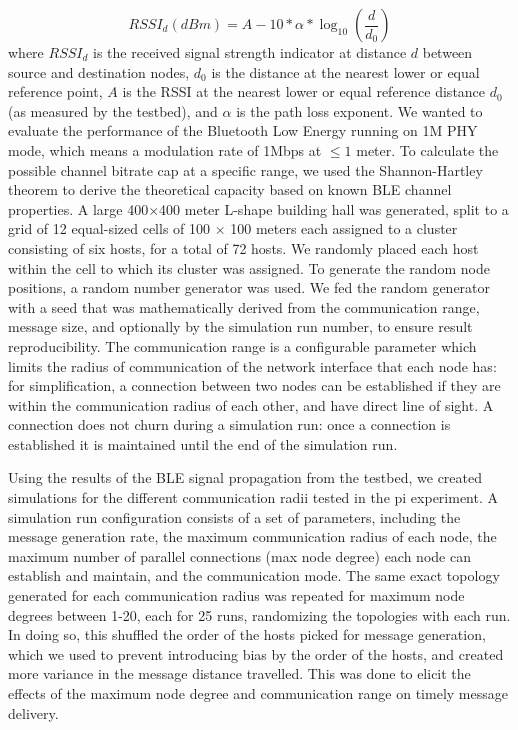 $$
RSSI_d (dBm) = A - 10 * \alpha * \log_{10}(\frac{d}{d_0})
$$
where $RSSI_d$ is the received signal strength indicator at distance $d$ between source and destination nodes, $d_0$ is the distance at the nearest lower or equal reference point, $A$ is the RSSI at the nearest lower or equal reference distance $d_0$ (as measured by the testbed), and $\alpha$ is the path loss exponent.
We wanted to evaluate the performance of the Bluetooth Low Energy running on 1M PHY mode, which means a modulation rate of 1Mbps at $\le1$ meter.
To calculate the possible channel bitrate cap at a specific range, we used the Shannon-Hartley theorem to derive the theoretical capacity based on known BLE channel properties.
A large 400$\times$400 meter L-shape building hall was generated, split to a grid of 12 equal-sized cells of 100 $\times$ 100 meters each assigned to a cluster consisting of six hosts, for a total of 72 hosts.
We randomly placed each host within the cell to which its cluster was assigned.
To generate the random node positions, a random number generator was used.
We fed the random generator with a seed that was mathematically derived from the communication range, message size, and optionally by the simulation run number, to ensure result reproducibility.
The communication range is a configurable parameter which limits the radius of communication of the network interface that each node has: for simplification, a connection between two nodes can be established if they are within the communication radius of each other, and have direct line of sight.
A connection does not churn during a simulation run: once a connection is established it is maintained until the end of the simulation run.

Using the results of the BLE signal propagation from the testbed, we created simulations for the different communication radii tested in the pi experiment.
A simulation run configuration consists of a set of parameters, including the message generation rate, the maximum communication radius of each node, the maximum number of parallel connections (max node degree) each node can establish and maintain, and the communication mode.
The same exact topology generated for each communication radius was repeated for maximum node degrees between 1-20, each for 25 runs, randomizing the topologies with each run.
In doing so, this shuffled the order of the hosts picked for message generation, which we used to prevent introducing bias by the order of the hosts, and created more variance in the message distance travelled.
This was done to elicit the effects of the maximum node degree and communication range on timely message delivery.

